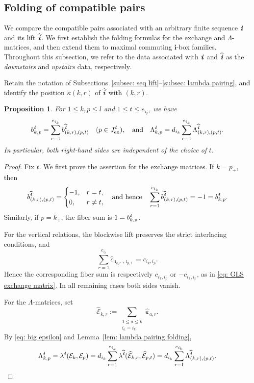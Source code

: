 \documentclass[12pt, leqno]{amsart}
\numberwithin{equation}{section}
\theoremstyle{plain}
\newtheorem{proposition}[lemma]{Proposition}
\theoremstyle{definition}
\renewcommand{\le}{\leqslant}
\newcommand{\seteq}{\mathbin{:=}}
\newcommand{\ex}{\mathrm{ex}}
\newcommand{\ve}{\boldsymbol{\varepsilon}}
\newcommand{\im}{\imath}
\newcommand{\ii}{ \textbf{\textit{i}}}
\newcommand{\hc}{\widehat{c}}
\newcommand{\hii}{{\widehat{\ii}}}
\newcommand{\hve}{{\widehat{\ve}}}
\newcommand{\bfi}{\mathbf{i}}
\newcommand{\calE}{\mathcal{E}}
\newcommand{\hcalE}{\widehat{\calE}}
\newcommand{\qtq}[1][{and}]{\quad\text{{#1}}\quad}
\newcommand{\qtqh}[1][{and hence}]{\quad\text{{#1}}\quad}
\begin{document}
\subsection{Folding of compatible pairs}

We compare the compatible pairs associated with an arbitrary
finite sequence $\ii$ and its lift $\hii$. We first establish the
folding formulas for the exchange and $\Lambda$-matrices, and then
extend them to maximal commuting $\bfi$-box families.
Throughout this subsection, we refer to the data associated with
$\ii$ and $\hii$ as the \emph{downstairs} and \emph{upstairs} data,
respectively.

Retain the notation of Subsections~\ref{subsec: seq lift}--\ref{subsec: lambda pairing}, and identify the position
$\kappa(k,r)$ of $\hii$ with $(k,r)$.

\begin{proposition}\label{prop: GLS pair folding}
For $1\le k,p\le l$ and $1\le t\le e_{i_p}$, we have
\[
b^\ii_{k,p} = \sum_{r=1}^{e_{i_k}} b^\hii_{(k,r),(p,t)}  \quad (p\in J^\ii_{\ex}),
\qtq
\Lambda^\ii_{k,p} = d_{i_k}\sum_{r=1}^{e_{i_k}} \Lambda^\hii_{(k,r),(p,t)}.
\]
In particular, both right-hand sides are independent of the choice of
$t$.
\end{proposition}

\begin{proof}
Fix $t$. We first prove the assertion for the exchange matrices.
If $k=p_+$, then
\[
b^\hii_{(k,r),(p,t)} =
\begin{cases}
-1 ,&r=t,\\
0,&r\neq t,
\end{cases}
\qtqh
\sum_{r=1}^{e_{i_k}} b^\hii_{(k,r),(p,t)} =-1=b^\ii_{k,p}.
\]
Similarly, if $p=k_+$, the fiber sum is $1=b^\ii_{k,p}$.

For the vertical relations, the blockwise lift preserves the strict
interlacing conditions, and
\[
\sum_{r=1}^{e_{i_k}} \hc_{\im_{k,r},\im_{p,t}} = c_{i_k,i_p}.
\]
Hence the corresponding fiber sum is respectively
$c_{i_k,i_p}$ or $-c_{i_k,i_p}$, as in
\eqref{eq: GLS exchange matrix}. In all remaining cases both sides
vanish.

For the $\Lambda$-matrices, set
\[
\hcalE_{k,r} \seteq \sum_{\substack{1\le a\le k\\ i_a=i_k}}\hve_{a,r}.
\]
By \eqref{eq: big epsilon} and
Lemma~\ref{lem: lambda pairing folding},
\[
\Lambda^\ii_{k,p} = \lambda^\ii(\calE_k,\calE_p)
= d_{i_k}\sum_{r=1}^{e_{i_k}} \lambda^\hii(\hcalE_{k,r},\hcalE_{p,t})
= d_{i_k}\sum_{r=1}^{e_{i_k}} \Lambda^\hii_{(k,r),(p,t)}.
\qedhere
\]
\end{proof}
\end{document}
